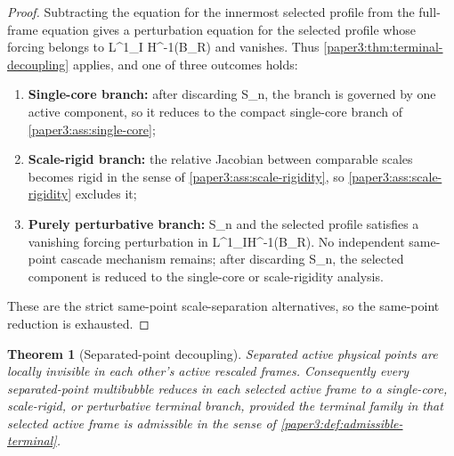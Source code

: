 \documentclass[11pt]{amsart}
\def\({}%
\def\){}%
\theoremstyle{plain}
\newtheorem{theorem}{Theorem}[section]
\theoremstyle{definition}
\theoremstyle{remark}
\begin{document}
\begin{proof}
Subtracting the equation for the innermost selected profile from the full-frame
equation gives a perturbation equation for the selected profile whose forcing
belongs to \(L^1_I H^{-1}(B_R)\) and vanishes.  Thus
\cref{paper3:thm:terminal-decoupling} applies, and one of three outcomes holds:
\begin{enumerate}[label=\textup{(\alph*)}]
\item \textbf{Single-core branch:}
  after discarding \(S_n\), the branch is governed by one active component, so it
  reduces to the compact single-core branch of \cref{paper3:ass:single-core};
\item \textbf{Scale-rigid branch:}
  the relative Jacobian between comparable scales becomes rigid in the sense of
  \cref{paper3:ass:scale-rigidity}, so \cref{paper3:ass:scale-rigidity} excludes it;
\item \textbf{Purely perturbative branch:}
  \(S_n\) and the selected profile satisfies a vanishing forcing perturbation
  in \(L^1_IH^{-1}(B_R)\).  No independent same-point cascade mechanism remains;
  after discarding \(S_n\), the selected component is reduced to the single-core
  or scale-rigidity analysis.
\end{enumerate}

These are the strict same-point scale-separation alternatives, so the
same-point reduction is exhausted.
\end{proof}


\begin{theorem}[Separated-point decoupling]\label{paper3:thm:separated-point-reduction}
Separated active physical points are locally invisible in each other's active
rescaled frames.  Consequently every separated-point multibubble reduces in each
selected active frame to a single-core, scale-rigid, or perturbative terminal
branch, provided the terminal family in that selected active frame is
admissible in the sense of \cref{paper3:def:admissible-terminal}.
\end{theorem}
\end{document}

